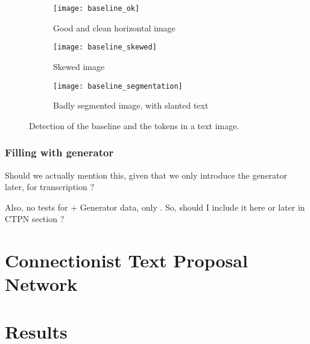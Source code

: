 			\begin{figure}[h!]
				\centering
				\begin{subfigure}{\linewidth}
					\texttt{[image: baseline\_ok]}
					\caption{Good and clean horizontal image}
					\label{fig:baseline_ok}
				\end{subfigure}

				\begin{subfigure}{\linewidth}
					\texttt{[image: baseline\_skewed]}
					\caption{Skewed image}
					\label{fig:baseline_skewed}
				\end{subfigure}

				\begin{subfigure}{\linewidth}
					\texttt{[image: baseline\_segmentation]}
					\caption{Badly segmented image, with slanted text}
					\label{fig:baseline_segmentation}
				\end{subfigure}
				\caption[Baseline and tokens]{Detection of the baseline and the tokens in a text image.}
				\label{fig:baseline}
			\end{figure}



		\subsubsection{Filling with generator}
		\startToDo
			Should we actually mention this, given that we only introduce the generator later, for transcription ?

			Also, no tests for \FRCNN{} + Generator data, only \CTPN{}. So, should I include it here or later in CTPN section ?
		\stopToDo






\section{Connectionist Text Proposal Network}\label{sec:ctpn}




\section{Results}\label{sec:detection_results}


